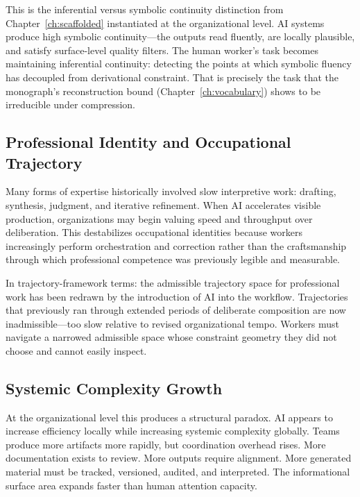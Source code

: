 \claimP This is the inferential versus symbolic continuity distinction from
Chapter~\ref{ch:scaffolded} instantiated at the organizational level. AI systems
produce high symbolic continuity---the outputs read fluently, are locally
plausible, and satisfy surface-level quality filters. The human worker's task
becomes maintaining inferential continuity: detecting the points at which symbolic
fluency has decoupled from derivational constraint. That is precisely the task
that the monograph's reconstruction bound (Chapter~\ref{ch:vocabulary}) shows to
be irreducible under compression.

\subsection{Professional Identity and Occupational Trajectory}

\claimP Many forms of expertise historically involved slow interpretive work:
drafting, synthesis, judgment, and iterative refinement. When AI accelerates
visible production, organizations may begin valuing speed and throughput over
deliberation. This destabilizes occupational identities because workers
increasingly perform orchestration and correction rather than the craftsmanship
through which professional competence was previously legible and measurable.

In trajectory-framework terms: the admissible trajectory space for professional
work has been redrawn by the introduction of AI into the workflow. Trajectories
that previously ran through extended periods of deliberate composition are now
inadmissible---too slow relative to revised organizational tempo. Workers must
navigate a narrowed admissible space whose constraint geometry they did not choose
and cannot easily inspect.

\subsection{Systemic Complexity Growth}

\claimP At the organizational level this produces a structural paradox. AI appears
to increase efficiency locally while increasing systemic complexity globally. Teams
produce more artifacts more rapidly, but coordination overhead rises. More
documentation exists to review. More outputs require alignment. More generated
material must be tracked, versioned, audited, and interpreted. The informational
surface area expands faster than human attention capacity.

